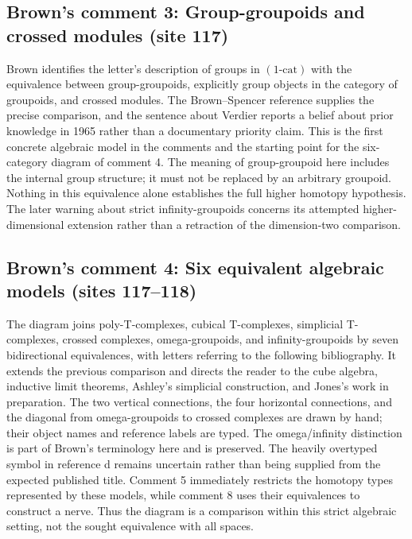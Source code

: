 \subsection*{Brown's comment 3: Group-groupoids and crossed modules (site 117)}
Brown identifies the letter's description of groups in $(1\text{-cat})$ with the equivalence between group-groupoids, explicitly group objects in the category of groupoids, and crossed modules. The Brown--Spencer reference supplies the precise comparison, and the sentence about Verdier reports a belief about prior knowledge in 1965 rather than a documentary priority claim. This is the first concrete algebraic model in the comments and the starting point for the six-category diagram of comment 4. The meaning of group-groupoid here includes the internal group structure; it must not be replaced by an arbitrary groupoid. Nothing in this equivalence alone establishes the full higher homotopy hypothesis. The later warning about strict infinity-groupoids concerns its attempted higher-dimensional extension rather than a retraction of the dimension-two comparison.

\subsection*{Brown's comment 4: Six equivalent algebraic models (sites 117--118)}
The diagram joins poly-T-complexes, cubical T-complexes, simplicial T-complexes, crossed complexes, omega-groupoids, and infinity-groupoids by seven bidirectional equivalences, with letters referring to the following bibliography. It extends the previous comparison and directs the reader to the cube algebra, inductive limit theorems, Ashley's simplicial construction, and Jones's work in preparation. The two vertical connections, the four horizontal connections, and the diagonal from omega-groupoids to crossed complexes are drawn by hand; their object names and reference labels are typed. The omega/infinity distinction is part of Brown's terminology here and is preserved. The heavily overtyped symbol in reference d remains uncertain rather than being supplied from the expected published title. Comment 5 immediately restricts the homotopy types represented by these models, while comment 8 uses their equivalences to construct a nerve. Thus the diagram is a comparison within this strict algebraic setting, not the sought equivalence with all spaces.

